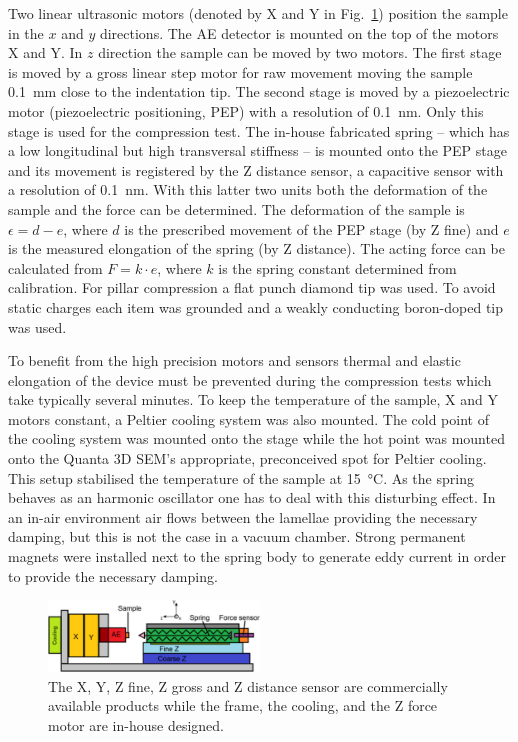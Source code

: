 Two linear ultrasonic motors (denoted by X and Y in Fig.~\ref{fig:nanotest_schematic}) position the sample in the $x$ and $y$ directions. The AE detector is mounted on the top of the motors X and Y. In $z$ direction the sample can be moved by two motors. The first stage is moved by a gross linear step motor for raw movement moving the sample \SI{0.1}{mm} close to the indentation tip. The second stage is moved by a piezoelectric motor (piezoelectric positioning, PEP) with a resolution of \SI{0.1}{nm}. Only this stage is used for the compression test. The in-house fabricated spring -- which has a low longitudinal but high transversal stiffness -- is mounted onto the PEP stage and its movement is registered by the Z distance sensor, a capacitive sensor with a resolution of \SI{0.1}{nm}. With this latter two units both the deformation of the sample and the force can be determined. The deformation of the sample is $\epsilon = d-e$, where $d$ is the prescribed movement of the PEP stage (by Z fine) and $e$ is the measured elongation of the spring (by Z distance). The acting force can be calculated from $F=k \cdot e$, where $k$ is the spring constant determined from calibration. For pillar compression a flat punch diamond tip was used. To avoid static charges each item was grounded and a weakly conducting boron-doped tip was used.

To benefit from the high precision motors and sensors thermal and elastic elongation of the device must be prevented during the compression tests which take typically several minutes. To keep the temperature of the sample, X and Y motors constant, a Peltier cooling system was also mounted. The cold point of the cooling system was mounted onto the stage while the hot point was mounted onto the Quanta 3D SEM's appropriate, preconceived spot for Peltier cooling. This setup stabilised the temperature of the sample at \SI{15}{\celsius}. As the spring behaves as an harmonic oscillator one has to deal with this disturbing effect. In an in-air environment air flows between the lamellae providing the necessary damping, but this is not the case in a vacuum chamber. Strong permanent magnets were installed next to the spring body to generate eddy current in order to provide the necessary damping.



\begin{figure}[htbp!] 
  \centering
    \includegraphics[width=0.5\textwidth]{nanotest}
    \caption{The X, Y, Z fine, Z gross and Z distance sensor are commercially available products while the frame, the cooling, and the Z force motor are in-house designed.\label{fig:nanotest_schematic}}
\end{figure}

